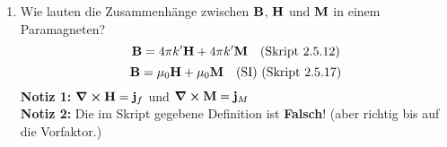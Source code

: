 \begin{enumerate}
  \item Wie lauten die Zusammenhänge zwischen $\vb B$, $\vb H$ 
        und $\vb M$ in einem Paramagneten?
        $$\vb B = 4\pi k'\vb H + 4\pi k'\vb M\quad\text{(Skript 2.5.12)}$$
        $$\vb B = \mu_0 \vb H + \mu_0 \vb M \quad\text{(SI) 
        (Skript 2.5.17)}$$
        \textbf{Notiz 1:} $\displaystyle \curl \vb H = \vb j_f$ und 
        $\displaystyle \curl \vb M=\vb j_M$\\
        \textbf{Notiz 2:} Die im Skript gegebene Definition ist 
        \textbf{Falsch}! (aber richtig bis auf die Vorfaktor.)
\end{enumerate}
